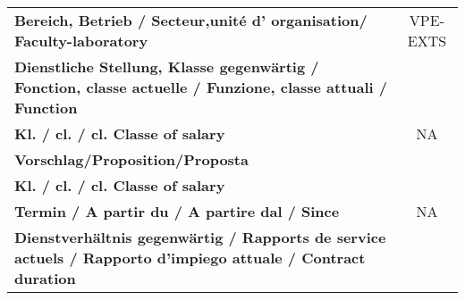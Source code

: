 \documentclass[
]{article}
\begin{document}
\begin{longtable}[]{@{}lc@{}}
\begin{minipage}[t]{0.44\columnwidth}\raggedright
\textbf{Bereich, Betrieb / Secteur,unité d' organisation/
Faculty-laboratory}\strut
\end{minipage} & \begin{minipage}[t]{0.50\columnwidth}\centering
VPE-EXTS\strut
\end{minipage}\tabularnewline
\begin{minipage}[t]{0.44\columnwidth}\raggedright
\textbf{Dienstliche Stellung, Klasse gegenwärtig / Fonction, classe
actuelle / Funzione, classe attuali / Function}\strut
\end{minipage} & \begin{minipage}[t]{0.50\columnwidth}\centering
0\strut
\end{minipage}\tabularnewline
\begin{minipage}[t]{0.44\columnwidth}\raggedright
\textbf{Kl. / cl. / cl. Classe of salary}\strut
\end{minipage} & \begin{minipage}[t]{0.50\columnwidth}\centering
NA\strut
\end{minipage}\tabularnewline
\begin{minipage}[t]{0.44\columnwidth}\raggedright
\textbf{Vorschlag/Proposition/Proposta}\strut
\end{minipage} & \begin{minipage}[t]{0.50\columnwidth}\centering
\strut
\end{minipage}\tabularnewline
\begin{minipage}[t]{0.44\columnwidth}\raggedright
\textbf{Kl. / cl. / cl. Classe of salary}\strut
\end{minipage} & \begin{minipage}[t]{0.50\columnwidth}\centering
\strut
\end{minipage}\tabularnewline
\begin{minipage}[t]{0.44\columnwidth}\raggedright
\textbf{Termin / A partir du / A partire dal / Since}\strut
\end{minipage} & \begin{minipage}[t]{0.50\columnwidth}\centering
NA\strut
\end{minipage}\tabularnewline
\begin{minipage}[t]{0.44\columnwidth}\raggedright
\textbf{Dienstverhältnis gegenwärtig / Rapports de service actuels /
Rapporto d'impiego attuale / Contract duration}\strut
\end{minipage} & \begin{minipage}[t]{0.50\columnwidth}\centering

\end{minipage}
\end{longtable}
\end{document}
